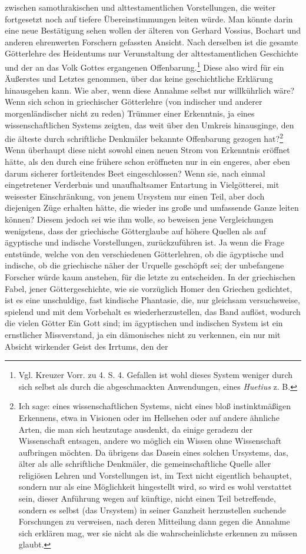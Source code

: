 \documentclass[a4paper, 11pt, oneside]{article}
\begin{document}
zwischen samothrakischen und alttestamentlichen Vorstellungen, die weiter fortgesetzt noch auf tiefere Übereinstimmungen leiten würde. Man könnte darin eine neue Bestätigung sehen wollen der älteren von Gerhard Vossius, Bochart und anderen ehrenwerten Forschern gefassten Ansicht. Nach derselben ist die gesamte Götterlehre des Heidentums nur Verunstaltung der alttestamentlichen Geschichte und der an das Volk Gottes ergangenen Offenbarung.\footnote{Vgl. Kreuzer Vorr. zu 4. S. 4. Gefallen ist wohl dieses System weniger durch sich selbst als durch die abgeschmackten Anwendungen, eines \emph{Huetius} z. B.} Diese also wird für ein Äußerstes und Letztes genommen, über das keine geschichtliche Erklärung hinausgehen kann. Wie aber, wenn diese Annahme selbst nur willkührlich wäre? Wenn sich schon in griechischer Götterlehre (von indischer und anderer morgenländischer nicht zu reden) Trümmer einer Erkenntnis, ja eines wissenschaftlichen Systems zeigten, das weit über den Umkreis hinausginge, den die älteste durch schriftliche Denkmäler bekannte Offenbarung gezogen hat?\footnote{Ich sage: eines wissenschaftlichen Systems, nicht eines bloß instinktmäßigen Erkennens, etwa in Visionen oder im Hellsehen oder auf andere ähnliche Arten, die man sich heutzutage ausdenkt, da einige geradezu der Wissenschaft entsagen, andere wo möglich ein Wissen ohne Wissenschaft aufbringen möchten. Da übrigens das Dasein eines solchen Ursystems, das, älter als alle schriftliche Denkmäler, die gemeinschaftliche Quelle aller religiösen Lehren und Vorstellungen ist, im Text nicht eigentlich behauptet, sondern nur als eine Möglichkeit hingestellt wird, so wird es wohl verstattet sein, dieser Anführung wegen auf künftige, nicht einen Teil betreffende, sondern es selbst (das Ursystem) in seiner Ganzheit herzustellen suchende Forschungen zu verweisen, nach deren Mitteilung dann gegen die Annahme sich erklären mag, wer sie nicht als die wahrscheinlichste erkennen zu müssen glaubt.} Wenn überhaupt diese nicht sowohl einen neuen Strom von Erkenntnis eröffnet hätte, als den durch eine frühere schon eröffneten nur in ein engeres, aber eben darum sicherer fortleitendes Beet eingeschlossen? Wenn sie, nach einmal eingetretener Verderbnis und unaufhaltsamer Entartung in Vielgötterei, mit weisester Einschränkung, von jenem Ursystem nur einen Teil, aber doch diejenigen Züge erhalten hätte, die wieder ins große und umfassende Ganze leiten können? Diesem jedoch sei wie ihm wolle, so beweisen jene Vergleichungen wenigstens, dass der griechische Götterglaube auf höhere Quellen als auf ägyptische und indische Vorstellungen, zurückzuführen ist. Ja wenn die Frage entstünde, welche von den verschiedenen Götterlehren, ob die ägyptische und indische, ob die griechische näher der Urquelle geschöpft sei; der unbefangene Forscher würde kaum anstehen, für die letzte zu entscheiden. In der griechischen Fabel, jener Göttergeschichte, wie sie vorzüglich Homer den Griechen gedichtet, ist es eine unschuldige, fast kindische Phantasie, die, nur gleichsam versuchsweise, spielend und mit dem Vorbehalt es wiederherzustellen, das Band auflöst, wodurch die vielen Götter Ein Gott sind; im ägyptischen und indischen System ist ein ernstlicher Missverstand, ja ein dämonisches nicht zu verkennen, ein nur mit Absicht wirkender Geist des Irrtums, den der 
\end{document}

